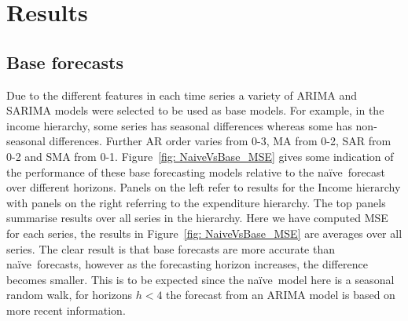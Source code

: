 \documentclass[graybox]{svmult}
\def\naive{na\"{i}ve\ }
\begin{document}
%
%
%
%




\section{Results}\label{sec:results}

\subsection{Base forecasts}

Due to the different features in each time series a variety of ARIMA and SARIMA models were selected to be used as base models. For example, in the income hierarchy, some series has seasonal differences whereas some has non-seasonal differences. Further AR order varies from 0-3, MA from 0-2, SAR from 0-2 and SMA from 0-1. Figure~\ref{fig: NaiveVsBase_MSE} gives some indication of the performance of these base forecasting models relative to the \naive forecast over different horizons.  Panels on the left refer to results for the Income hierarchy with panels on the right referring to the expenditure hierarchy.  The top panels summarise results over all series in the hierarchy.  Here we have computed MSE for each series, the results in Figure~\ref{fig: NaiveVsBase_MSE} are averages over all series. The clear result is that base forecasts are more accurate than \naive forecasts, however as the forecasting horizon increases, the difference becomes smaller.  This is to be expected since the \naive model here is a seasonal random walk, for horizons $h<4$ the forecast from an ARIMA model is based on more recent information.
\end{document}
